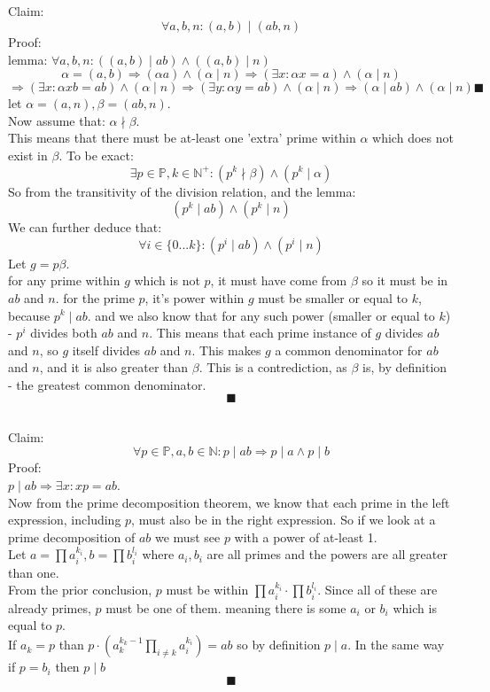 \documentclass{article}
\begin{document}
\subsection{}
Claim:
\[
	\forall a,b,n: (a,b)\mid (ab,n)
\]
Proof:\\
lemma: $\forall a, b, n: ((a,b)\mid ab)\wedge((a,b)\mid n)$
\[
	\alpha = (a,b)
	\Rightarrow (\alpha a)\wedge(\alpha\mid n)	
	\Rightarrow (\exists x: \alpha x =a)\wedge(\alpha\mid n)	
\]
\[
	\Rightarrow (\exists x: \alpha xb =ab)\wedge(\alpha\mid n)	
	\Rightarrow (\exists y: \alpha y =ab)\wedge(\alpha\mid n)	
	\Rightarrow (\alpha\mid ab)\wedge(\alpha\mid n)\blacksquare
\]
let $\alpha = (a, n), \beta = (ab, n)$.\\
Now assume that: $\alpha\nmid \beta$.\\
This means that there must be at-least one 'extra' prime within $\alpha$ which does not 
exist in $\beta$. To be exact:
\[
	\exists p\in\mathbb{P},k\in\mathbb{N}^+:(p^k\nmid \beta)\wedge (p^k\mid\alpha)
\]
So from the transitivity of the division relation, and the lemma:
\[
	(p^k\mid ab)\wedge(p^k\mid n)	
\]
	We can further deduce that:
\[
	\forall i\in\{0...k\}: 	
	(p^i\mid ab)\wedge(p^i\mid n)	
\]
Let $g=p\beta$.\\
for any prime within $g$ which is not $p$, it must have come from $\beta$ so it must be in $ab$ and $n$.
for the prime $p$, it's power within $g$ must be smaller or equal to $k$, because $p^k\mid ab$.
and we also know that for any such power (smaller or equal to $k$) - $p^i$ divides both $ab$ and $n$.
This means that each prime instance of $g$ divides $ab$ and $n$, so $g$ itself divides $ab$ and $n$.
This makes $g$ a common denominator for $ab$ and $n$, and it is also greater than $\beta$.
This is a contrediction, as $\beta$ is, by definition - the greatest common denominator.
\[\blacksquare\]

\subsection{}
Claim:
\[
	\forall p\in\mathbb{P},a,b\in\mathbb{N}:p\mid ab\Rightarrow p\mid a\wedge p\mid b
\]
Proof:\\
$p\mid ab
\Rightarrow \exists x: xp=ab$.\\
Now from the prime decomposition theorem, we know that each prime in the left expression,
including $p$, must also be in the right expression. So if we look at a prime decomposition of $ab$
we must see $p$ with a power of at-least 1.\\
Let $a=\prod a_i^{k_i}, b=\prod b_i^{l_i}$ where $a_i, b_i$ are all primes and the powers
are all greater than one.\\
From the prior conclusion, $p$ must be within $\prod a_i^{k_i}\cdot\prod b_i^{l_i}$.
Since all of these are already primes, $p$ must be one of them. meaning there is some $a_i$ or $b_i$
which is equal to $p$.\\
If $a_k=p$ than $p\cdot(a_k^{k_k-1}\prod_{i\neq k} a_i^{k_i})=ab$ so by definition $p\mid a$.
In the same way if $p=b_i$ then $p\mid b$
\[\blacksquare\]
\end{document}
